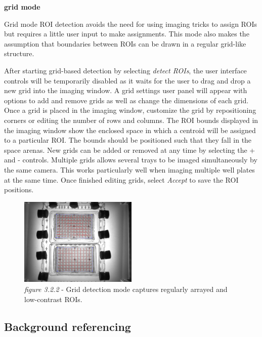 \documentclass[11pt]{article}
\begin{document}
\textbf{grid mode}

Grid mode ROI detection avoids the need for using imaging tricks to assign ROIs but requires a little user input to make assignments. This mode also makes the assumption that boundaries between ROIs can be drawn in a regular grid-like structure.

After starting grid-based detection by selecting \textit{detect ROIs}, the user interface controls will be temporarily disabled as it waits for the user to drag and drop a new grid into the imaging window. A grid settings user panel will appear with options to add and remove grids as well as change the dimensions of each grid. Once a grid is placed in the imaging window, customize the grid by repositioning corners or editing the number of rows and columns. The ROI bounds displayed in the imaging window show the enclosed space in which a centroid will be assigned to a particular ROI. The bounds should be positioned such that they fall in the space arenas. New grids can be added or removed at any time by selecting the + and - controls. Multiple grids allows several trays to be imaged simultaneously by the same camera. This works particularly well when imaging multiple well plates at the same time. Once finished editing grids, select \textit{Accept} to save the ROI positions.

\vspace*{.75cm}
\begin{figure}[h!]
	\begin{center}
		\includegraphics[width=0.5\textwidth]{images/Hardware Setup/Behavioral Arenas/ROIs_detected_1.png}
		\caption*{\footnotesize {\textit{figure 3.2.2} - Grid detection mode captures regularly arrayed and low-contrast ROIs.}}
	\end{center}
\end{figure}


\subsection{Background referencing}
\end{document}
